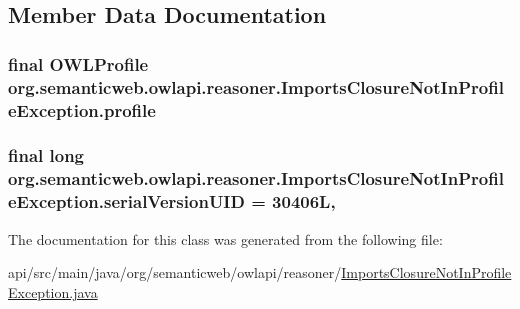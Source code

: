 \subsection{Member Data Documentation}
\hypertarget{classorg_1_1semanticweb_1_1owlapi_1_1reasoner_1_1_imports_closure_not_in_profile_exception_ab85e99cbbda0c387ab5ec4d853079f71}{
\subsubsection[{profile}]{\setlength{\rightskip}{0pt plus 5cm}final {\bf O\-W\-L\-Profile} org.\-semanticweb.\-owlapi.\-reasoner.\-Imports\-Closure\-Not\-In\-Profile\-Exception.\-profile\hspace{0.3cm}{\ttfamily [private]}}}\label{classorg_1_1semanticweb_1_1owlapi_1_1reasoner_1_1_imports_closure_not_in_profile_exception_ab85e99cbbda0c387ab5ec4d853079f71}
\hypertarget{classorg_1_1semanticweb_1_1owlapi_1_1reasoner_1_1_imports_closure_not_in_profile_exception_a60388bb0a68c42ecdd54ac77cb45f18b}{
\subsubsection[{serial\-Version\-U\-I\-D}]{\setlength{\rightskip}{0pt plus 5cm}final long org.\-semanticweb.\-owlapi.\-reasoner.\-Imports\-Closure\-Not\-In\-Profile\-Exception.\-serial\-Version\-U\-I\-D = 30406\-L\hspace{0.3cm}{\ttfamily [static]}, {\ttfamily [private]}}}\label{classorg_1_1semanticweb_1_1owlapi_1_1reasoner_1_1_imports_closure_not_in_profile_exception_a60388bb0a68c42ecdd54ac77cb45f18b}


The documentation for this class was generated from the following file\-:\begin{DoxyCompactItemize}
\item 
api/src/main/java/org/semanticweb/owlapi/reasoner/\hyperlink{_imports_closure_not_in_profile_exception_8java}{Imports\-Closure\-Not\-In\-Profile\-Exception.\-java}\end{DoxyCompactItemize}
